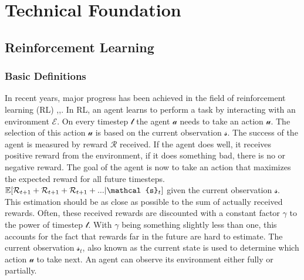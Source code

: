 %
%

\chapter{Technical Foundation}\label{chap.grundlagen}
\section{Reinforcement Learning}\label{reinforcementlearning}
\subsection*{Basic Definitions}\label{basic_rl_definitions}
In recent years, major progress has been achieved in the field of reinforcement learning (RL) \cite{mnih2013playing},\cite{alphazero},\cite{hideandseek}.
In RL, an agent learns to perform a task by interacting with an environment $\mathcal{E}$. On every timestep $\mathcal{t}$ the agent $\mathcal{a}$ needs to take an action $\mathcal{u}$. The selection of this action $\mathcal{u}$ is based on the current observation $\mathcal{s}$. The success of the agent is measured by reward $\mathcal{R}$ received. If the agent does well, it receives positive reward from the environment, if it does something bad, there is no or negative reward. The goal of the agent is now to take an action that maximizes the expected reward for all future timesteps. $\EX[\mathcal{R}_{t+1}+\mathcal{R}_{t+1}+\mathcal{R}_{t+1}+...|\mathcal{s}_{t}]$ given the current observation $\mathcal{s}$.\\
This estimation should be as close as possible to the sum of actually received rewards. Often, these received rewards are discounted with a constant factor $\mathcal{\gamma}$ to the power of timestep $\mathcal{t}$. With $\mathcal{\gamma}$ being something slightly less than one, this accounts for the fact that rewards far in the future are hard to estimate.
The current observation $\mathcal{s}_{t}$, also known as the current state is used to determine which action $\mathcal{u}$ to take next. An agent can observe its environment either fully or partially.
